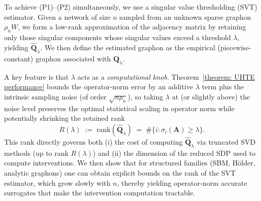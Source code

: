 \documentclass[11pt]{article}
\newcommand{\<}{\langle}
\renewcommand{\>}{\rangle}
\theoremstyle{plain}
\theoremstyle{definition}
\theoremstyle{remark}
\begin{document}
{To achieve (P1)--(P2) simultaneously, we use a singular value thresholding (SVT) estimator. Given a network of
size $n$ sampled from an unknown sparse graphon $\rho_n W$, we form a low-rank approximation of the adjacency
matrix by retaining only those singular components whose singular values exceed a threshold $\lambda$, yielding
$\widehat{\mathbf Q}_\lambda$. We then define the estimated graphon as the empirical (piecewise-constant)
graphon associated with $\widehat{\mathbf Q}_\lambda$.

A key feature is that $\lambda$ acts as a \emph{computational knob}. Theorem~\ref{theorem: UHTE performance} bounds the operator-norm error by
an additive $\lambda$ term plus the intrinsic sampling noise (of order $\sqrt{n\rho_n}$), so taking $\lambda$ at
(or slightly above) the noise level preserves the optimal statistical scaling in operator norm while potentially
shrinking the retained rank
\[
R(\lambda)\;:=\;\mathrm{rank}(\widehat{\mathbf Q}_\lambda)\;=\;\#\{i:\sigma_i(\mathbf A)\ge \lambda\}.
\]
This rank directly governs both (i) the cost of computing $\widehat{\mathbf Q}_\lambda$ via truncated SVD methods
(up to rank $R(\lambda)$) and (ii) the dimension of the reduced SDP used to compute interventions. We then show
that for structured families (SBM, H\"older, analytic graphons) one can obtain explicit bounds on the rank of the
SVT estimator, which grow slowly with $n$, thereby yielding operator-norm accurate surrogates that make the
intervention computation tractable.
}

\end{document}
